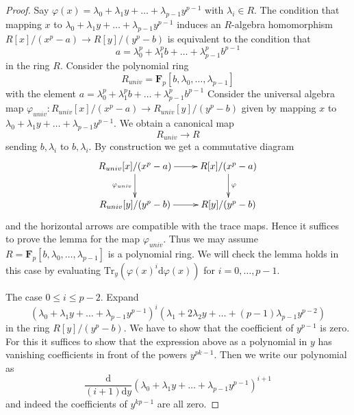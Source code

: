 \documentclass[10pt,a4paper]{amsart}
\theoremstyle{plain}
\theoremstyle{definition}
\theoremstyle{remark}
\numberwithin{equation}{subsection}
\begin{document}
\begin{proof}
Say $\varphi(x) = \lambda_0 + \lambda_1 y + \ldots + \lambda_{p - 1}y^{p - 1}$
with $\lambda_i \in R$. The condition that mapping $x$ to
$\lambda_0 + \lambda_1 y + \ldots + \lambda_{p - 1}y^{p - 1}$
induces an $R$-algebra homomorphism $R[x]/(x^p - a) \to R[y]/(y^p - b)$
is equivalent to the condition that
$$
a = \lambda_0^p + \lambda_1^p b + \ldots + \lambda_{p - 1}^pb^{p - 1}
$$
in the ring $R$. Consider the polynomial ring
$$
R_{univ} = \mathbf{F}_p[b, \lambda_0, \ldots, \lambda_{p - 1}]
$$
with the element
$a = \lambda_0^p + \lambda_1^p b + \ldots + \lambda_{p - 1}^pb^{p - 1}$
Consider the universal algebra map
$\varphi_{univ} : R_{univ}[x]/(x^p - a) \to R_{univ}[y]/(y^p - b)$
given by mapping $x$ to
$\lambda_0 + \lambda_1 y + \ldots + \lambda_{p - 1}y^{p - 1}$.
We obtain a canonical map
$$
R_{univ} \longrightarrow R
$$
sending $b, \lambda_i$ to $b, \lambda_i$. By construction we get a
commutative diagram
$$
\xymatrix{
R_{univ}[x]/(x^p - a) \ar[r] \ar[d]_{\varphi_{univ}} &
R[x]/(x^p - a) \ar[d]^\varphi \\
R_{univ}[y]/(y^p - b) \ar[r] & R[y]/(y^p - b)
}
$$
and the horizontal arrows are compatible with the trace maps. Hence it
suffices to prove the lemma for the map $\varphi_{univ}$. Thus we may
assume $R = \mathbf{F}_p[b, \lambda_0, \ldots, \lambda_{p - 1}]$
is a polynomial ring. We will check the lemma holds in this case
by evaluating
$\text{Tr}_y(\varphi(x)^i\text{d}\varphi(x))$ for $i = 0 , \ldots, p - 1$.

\medskip\noindent
The case $0 \leq i \leq p - 2$. Expand
$$
(\lambda_0 + \lambda_1 y + \ldots + \lambda_{p - 1}y^{p - 1})^i
(\lambda_1 + 2 \lambda_2 y + \ldots + (p - 1)\lambda_{p - 1}y^{p - 2})
$$
in the ring $R[y]/(y^p - b)$. We have to show that the coefficient
of $y^{p - 1}$ is zero. For this it suffices to show that
the expression above as a polynomial in $y$ has vanishing
coefficients in front of the powers $y^{pk - 1}$.
Then we write our polynomial as
$$
\frac{\text{d}}{(i + 1)\text{d}y}
(\lambda_0 + \lambda_1 y + \ldots + \lambda_{p - 1}y^{p - 1})^{i + 1}
$$
and indeed the coefficients of $y^{kp - 1}$ are all zero.


\end{proof}
\end{document}
